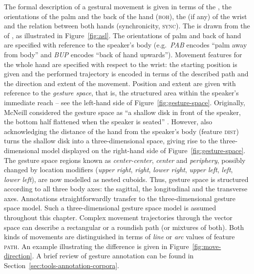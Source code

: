 \documentclass[output=paper]{langsci/langscibook}
\begin{document}
The formal description of a gestural movement is given in terms of the ,  the orientations of the palm  and the back of the hand (\textsc{boh}),  the  (if any) of the wrist  and the relation between both hands (synchronicity, \textsc{sync}). 
%
The  is drawn from the  of , as illustrated in Figure~\ref{fig:asl}.
%
The orientations  of palm and back of hand are specified with reference to the speaker's body (e.g.\ \textit{PAB} encodes \enquote{palm away from body} and \textit{BUP} encodes \enquote{back of hand upwards}). 
%
Movement features for the whole hand are specified with respect to the wrist: the starting position  is given and the performed trajectory is encoded in terms of the described path  and the direction  and extent  of the movement.
%
Position and extent are given with reference to the \emph{gesture space}, that is, the structured area within the speaker's immediate reach \citep[--89]{McNeill:1992} -- see the left-hand side of Figure~\ref{fig:gesture-space}. 
%
Originally, McNeill considered the gesture space as \enquote{a shallow disk in front of the speaker, the bottom half flattened when the speaker is seated} \citep[]{McNeill:1992}. 
%
However, also acknowledging the distance of the hand from the speaker's body (feature \textsc{dist}) turns the shallow disk into a three-dimensional space, giving rise to the three-dimensional model displayed on the right-hand side of Figure~\ref{fig:gesture-space}.
%
The gesture space regions known as \emph{center-center}, \emph{center} and \emph{periphery}, possibly changed by location modifiers (\emph{upper right}, \emph{right}, \emph{lower right}, \emph{upper left}, \emph{left}, \emph{lower left}), are now modelled as nested cuboids. 
%
Thus, gesture space is structured according to all three body axes: the sagittal, the longitudinal and the transverse axes.
%
Annotations straightforwardly transfer to the three-dimensional gesture space model.
%
Such a three-dimensional gesture space model is assumed throughout this chapter.
%
Complex movement trajectories through the vector space can describe a rectangular or a roundish path (or mixtures of both). 
%
Both kinds of movements are distinguished in terms of \textit{line}  or \textit{arc}  values of feature \textsc{path}.
%
An example illustrating the difference is given in Figure~\ref{fig:move-direction}.
%
A brief review of gesture annotation can be found in Section~\ref{sec:tools-annotation-corpora}.
%
\end{document}

